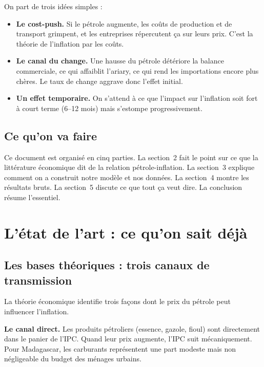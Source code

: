 \documentclass[12pt,a4paper]{article}
\begin{document}
On part de trois idées simples :

\begin{itemize}
  \item[\textbf{H1}] \textbf{Le cost-push.} Si le pétrole augmente, les coûts de production et de transport grimpent, et les entreprises répercutent ça sur leurs prix. C'est la théorie de l'inflation par les coûts.
  \item[\textbf{H2}] \textbf{Le canal du change.} Une hausse du pétrole détériore la balance commerciale, ce qui affaiblit l'ariary, ce qui rend les importations encore plus chères. Le taux de change aggrave donc l'effet initial.
  \item[\textbf{H3}] \textbf{Un effet temporaire.} On s'attend à ce que l'impact sur l'inflation soit fort à court terme (6--12 mois) mais s'estompe progressivement.
\end{itemize}

\subsection{Ce qu'on va faire}

Ce document est organisé en cinq parties. La section~2 fait le point sur ce que la littérature économique dit de la relation pétrole-inflation. La section~3 explique comment on a construit notre modèle et nos données. La section~4 montre les résultats bruts. La section~5 discute ce que tout ça veut dire. La conclusion résume l'essentiel.

\section{L'état de l'art : ce qu'on sait déjà}

\subsection{Les bases théoriques : trois canaux de transmission}

La théorie économique identifie trois façons dont le prix du pétrole peut influencer l'inflation.

\textbf{Le canal direct.} Les produits pétroliers (essence, gazole, fioul) sont directement dans le panier de l'IPC. Quand leur prix augmente, l'IPC suit mécaniquement. Pour Madagascar, les carburants représentent une part modeste mais non négligeable du budget des ménages urbains.
\end{document}
